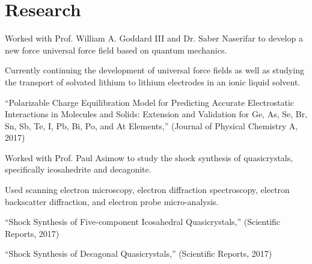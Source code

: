 \documentclass[letterpaper]{deedy-resume} %
\begin{document}
\begin{minipage}[t]{0.58\textwidth}






\section{Research}


\begin{tightitemize}
\item Worked with Prof. William A. Goddard III and Dr. Saber Naserifar to develop a new force universal force field based on quantum mechanics. 
\item Currently continuing the development of universal force fields as well as studying the transport of solvated lithium to lithium electrodes in an ionic liquid solvent.
\item ``Polarizable Charge Equilibration Model for Predicting Accurate Electrostatic Interactions in Molecules and Solids: Extension and Validation for Ge, As, Se, Br, Sn, Sb, Te, I, Pb, Bi, Po, and At Elements,'' (Journal of Physical Chemistry A, 2017)
\end{tightitemize}



\begin{tightitemize}
\item Worked with Prof. Paul Asimow to study the shock synthesis of quasicrystals, specifically icosahedrite and decagonite.
\item Used scanning electron microscopy, electron diffraction spectroscopy, electron backscatter diffraction, and electron probe micro-analysis.
\item ``Shock Synthesis of Five-component Icosahedral Quasicrystals,'' (Scientific Reports, 2017)
\item ``Shock Synthesis of Decagonal Quasicrystals,'' (Scientific Reports, 2017)
\end{tightitemize}


\end{minipage}
\end{document}
